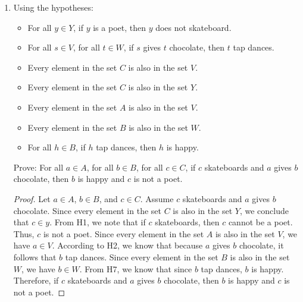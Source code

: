 \documentclass{article}
\begin{document}
\begin{enumerate}
    \item Using the hypotheses:

          \begin{itemize}
              \item For all $y \in Y$, if $y$ is a poet, then $y$ does not skateboard.
              \item For all $s \in V$, for all $t \in W$, if $s$ gives $t$ chocolate, then $t$ tap
                    dances.
              \item Every element in the set $C$ is also in the set $V$.
              \item Every element in the set $C$ is also in the set $Y$.
              \item Every element in the set $A$ is also in the set $V$.
              \item Every element in the set $B$ is also in the set $W$.
              \item For all $h \in B$, if $h$ tap dances, then $h$ is happy.
          \end{itemize}
          Prove: For all $a \in A$, for all $b \in B$, for all $c \in C$, if $c$ skateboards and $a$ gives $b$ chocolate, then $b$ is happy and $c$ is not a poet.

          \begin{proof}
              Let $a \in A$, $b \in B$, and $c \in C$. Assume $c$ skateboards and $a$ gives $b$ chocolate.
              Since every element in the set $C$ is also in the set $Y$, we conclude that $c \in y$.
              From H1, we note that if $c$ skateboards, then $c$ cannot be a poet. Thus, $c$ is not a poet.
              Since every element in the set $A$ is also in the set $V$, we have $a \in V$.
              According to H2, we know that because $a$ gives $b$ chocolate, it  follows that $b$ tap dances.
              Since every element in the set $B$ is also in the set $W$, we have $b \in W$.
              From H7, we know that since $b$ tap dances, $b$ is happy.
              Therefore, if $c$ skateboards and $a$ gives $b$ chocolate, then $b$ is happy and $c$ is not a poet.
          \end{proof}
\end{enumerate}
\end{document}
